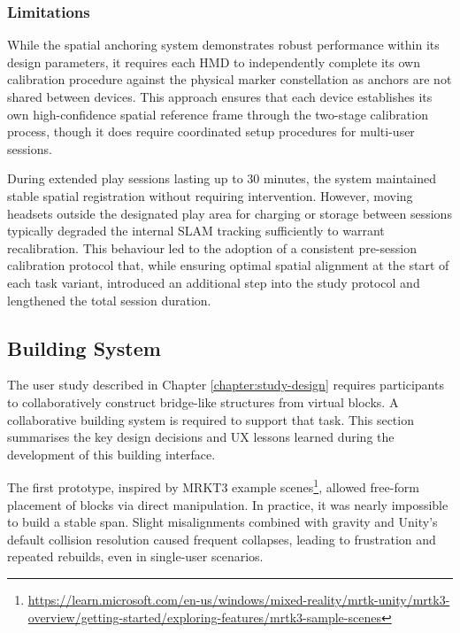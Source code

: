 \subsubsection{Limitations}
While the spatial anchoring system demonstrates robust performance within its design parameters, it requires each HMD to independently complete its own calibration procedure against the physical marker constellation as anchors are not shared between devices. This approach ensures that each device establishes its own high-confidence spatial reference frame through the two-stage calibration process, though it does require coordinated setup procedures for multi-user sessions.

During extended play sessions lasting up to 30 minutes, the system maintained stable spatial registration without requiring intervention. However, moving headsets outside the designated play area for charging or storage between sessions typically degraded the internal SLAM tracking sufficiently to warrant recalibration. This behaviour led to the adoption of a consistent pre-session calibration protocol that, while ensuring optimal spatial alignment at the start of each task variant, introduced an additional step into the study protocol and lengthened the total session duration.

\subsection{Building System}
The user study described in Chapter \ref{chapter:study-design} requires participants to collaboratively construct bridge-like structures from virtual blocks. A collaborative building system is required to support that task. This section summarises the key design decisions and UX lessons learned during the development of this building interface.

The first prototype, inspired by MRKT3 example scenes\footnote{\url{https://learn.microsoft.com/en-us/windows/mixed-reality/mrtk-unity/mrtk3-overview/getting-started/exploring-features/mrtk3-sample-scenes}}, allowed free-form placement of blocks via direct manipulation. In practice, it was nearly impossible to build a stable span. Slight misalignments combined with gravity and Unity's default collision resolution caused frequent collapses, leading to frustration and repeated rebuilds, even in single-user scenarios.

